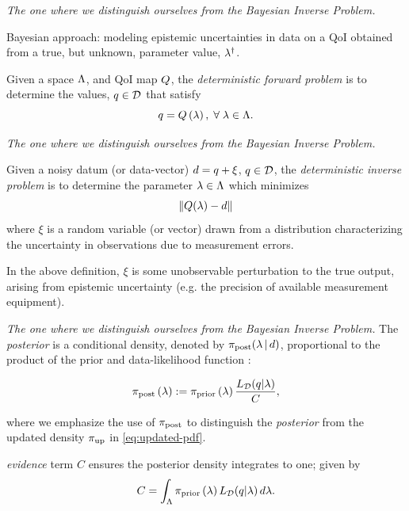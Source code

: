 \begin{frame}[t]{\it The one where we distinguish ourselves from the Bayesian Inverse Problem.}

Bayesian approach: modeling epistemic uncertainties in data on a QoI obtained from a true, but unknown, parameter value, $\lambda^\dagger$.

\vskip 10pt

\begin{defn}
  Given a space ${\Lambda}$, and QoI map $Q$, the \emph{deterministic forward problem} is to determine the values, $q \in \mathcal{D}$ that satisfy
  \begin{equation}
    q = Q\left ( \lambda \right ), \; \forall \; \lambda \in {\Lambda}.
  \end{equation}
\end{defn}


\end{frame}


\begin{frame}[t]{\it The one where we distinguish ourselves from the Bayesian Inverse Problem.}
\begin{defn}
  Given a noisy datum (or data-vector) $d = q + \xi$, $q \in \mathcal{D}$, the \emph{deterministic inverse problem} is to determine the parameter $\lambda \in {\Lambda}$ which minimizes
  \begin{equation}
    \left\Vert Q(\lambda) - d\right\Vert
  \end{equation}
  where $\xi$ is a random variable (or vector) drawn from a distribution characterizing the uncertainty in observations due to measurement errors.
\end{defn}

In the above definition, $\xi$ is some unobservable perturbation to the true output, arising from epistemic uncertainty (e.g. the precision of available measurement equipment).

\end{frame}


\begin{frame}[t]{\it The one where we distinguish ourselves from the Bayesian Inverse Problem.}
The \emph{posterior} is a conditional density, denoted by $\pi_\text{post}(\lambda\, | \, d)$, proportional to the product of the prior and data-likelihood function \cite{Walpole, Berger, Complete, Smith}:

\begin{equation}\label{eq:sb_post}
    \operatorname*{\pi_{post}}\left ( \lambda \right ) := \operatorname*{\pi_{prior}}\left ( \lambda \right ) \frac{L_{\mathcal{D}} (q | \lambda)}{ C },
\end{equation}

\noindent where we emphasize the use of $\operatorname*{\pi_{post}}$ to distinguish the \emph{posterior} from the updated density $\operatorname*{\pi_{up}}$ in \eqref{eq:updated-pdf}.

\emph{evidence} term $C$ ensures the posterior density integrates to one; given by
\[
C = \int_{\Lambda} \operatorname*{\pi_{prior}}\left ( \lambda \right ) L_{\mathcal{D}}(q | \lambda) \, d\lambda.
\]

\end{frame}

